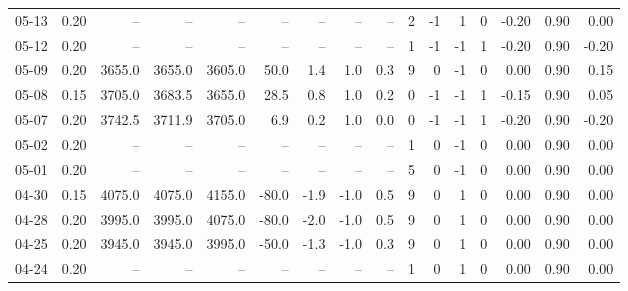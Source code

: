 \begin{threeparttable}
{\begin{tabular}{lrrrrrrrrrrrrrrr}
  05-13 &     0.20 &     -- &     -- &     -- &         -- &             -- &                       -- &                  -- &              2 &        -1 &     1 &         0 &      -0.20 &      0.90 &           0.00 \\
  05-12 &     0.20 &     -- &     -- &     -- &         -- &             -- &                       -- &                  -- &              1 &        -1 &    -1 &         1 &      -0.20 &      0.90 &          -0.20 \\
  05-09 &     0.20 & 3655.0 & 3655.0 & 3605.0 &       50.0 &            1.4 &                      1.0 &                 0.3 &              9 &         0 &    -1 &         0 &       0.00 &      0.90 &           0.15 \\
  05-08 &     0.15 & 3705.0 & 3683.5 & 3655.0 &       28.5 &            0.8 &                      1.0 &                 0.2 &              0 &        -1 &    -1 &         1 &      -0.15 &      0.90 &           0.05 \\
  05-07 &     0.20 & 3742.5 & 3711.9 & 3705.0 &        6.9 &            0.2 &                      1.0 &                 0.0 &              0 &        -1 &    -1 &         1 &      -0.20 &      0.90 &          -0.20 \\
  05-02 &     0.20 &     -- &     -- &     -- &         -- &             -- &                       -- &                  -- &              1 &         0 &    -1 &         0 &       0.00 &      0.90 &           0.00 \\
  05-01 &     0.20 &     -- &     -- &     -- &         -- &             -- &                       -- &                  -- &              5 &         0 &    -1 &         0 &       0.00 &      0.90 &           0.00 \\
  04-30 &     0.15 & 4075.0 & 4075.0 & 4155.0 &      -80.0 &           -1.9 &                     -1.0 &                 0.5 &              9 &         0 &     1 &         0 &       0.00 &      0.90 &           0.00 \\
  04-28 &     0.20 & 3995.0 & 3995.0 & 4075.0 &      -80.0 &           -2.0 &                     -1.0 &                 0.5 &              9 &         0 &     1 &         0 &       0.00 &      0.90 &           0.00 \\
  04-25 &     0.20 & 3945.0 & 3945.0 & 3995.0 &      -50.0 &           -1.3 &                     -1.0 &                 0.3 &              9 &         0 &     1 &         0 &       0.00 &      0.90 &           0.00 \\
  04-24 &     0.20 &     -- &     -- &     -- &         -- &             -- &                       -- &                  -- &              1 &         0 &     1 &         0 &       0.00 &      0.90 &           0.00 \\

\end{tabular}}
\end{threeparttable}
